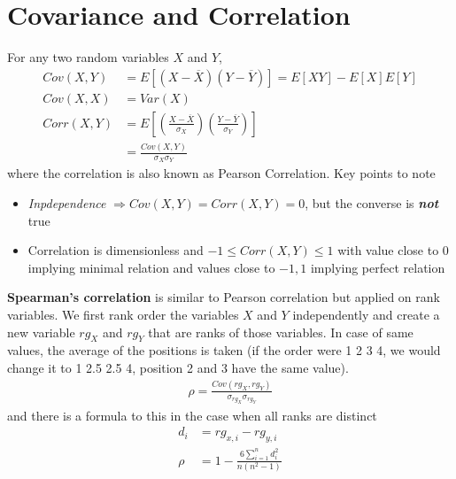 \documentclass[../probability-notes.tex]{subfiles}
\begin{document}
    \section{Covariance and Correlation}
    For any two random variables $X$ and $Y$,
    \begin{align*}
        Cov(X,Y) &= E[(X - \overline{X})(Y - \overline{Y})] = E[XY] - E[X]E[Y]\\
        Cov(X,X) &= Var(X)\\
        Corr(X,Y) &= E[(\frac{X - \overline{X}}{\sigma_{X}}) (\frac{Y - \overline{Y}}{\sigma_{Y}})]\\
        &= \frac{Cov(X,Y)}{\sigma_{X} \sigma_{Y}}
    \end{align*}
    where the correlation is also known as Pearson Correlation. Key points to note
    \begin{itemize}
        \item \emph{Inpdependence} $\Rightarrow Cov(X,Y) = Corr(X,Y) = 0$, but the converse is \emph{\textbf{not}} true
        \item Correlation is dimensionless and $-1 \leq Corr(X,Y) \leq 1$ with value close to $0$ implying minimal relation and values close to $-1, 1$ implying perfect relation
    \end{itemize}

    \textbf{Spearman's correlation} is similar to Pearson correlation but applied on rank variables. We first rank order the variables $X$ and $Y$ independently and create a new variable $rg_{X}$ and $rg_{Y}$ that are ranks of those variables. In case of same values, the average of the positions is taken (if the order were 1 2 3 4, we would change it to 1 2.5 2.5 4, position 2 and 3 have the same value).
    \begin{align*}
        \rho = \frac{Cov(rg_{X}, rg_{Y})}{\sigma_{rg_{X}} \sigma_{rg_{Y}}}
    \end{align*}
    and there is a formula to this in the case when all ranks are distinct
    \begin{align*}
        d_{i} &= rg_{x,i} - rg_{y,i}\\
        \rho &= 1 - \frac{6\sum_{i=1}^{n} d_{i}^{2}}{n(n^{2} - 1)}
    \end{align*}
\end{document}
